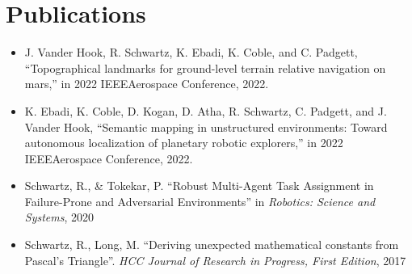 \documentclass[letterpaper,11pt]{article}
\makeatletter
\newcommand{\resumeItem}[1]{
  \item\small{
    {#1 \vspace{-2pt}}
  }
}
\newcommand{\resumeProjectHeading}[2]{
    \item
    \begin{tabular*}{0.97\textwidth}{l@{\extracolsep{\fill}}r}
      \small#1 & #2 \\
    \end{tabular*}\vspace{-7pt}
}
\newcommand{\resumeSubHeadingListStart}{\begin{itemize}[leftmargin=0.15in, label={}]}
\newcommand{\resumeSubHeadingListEnd}{\end{itemize}}
\newcommand{\resumeItemListStart}{\begin{itemize}}
\newcommand{\resumeItemListEnd}{\end{itemize}\vspace{-5pt}}
\makeatother
\begin{document}


\section{Publications}
\small{
    \begin{itemize}
        \item J. Vander Hook, R. Schwartz, K. Ebadi, K. Coble, and C. Padgett, “Topographical landmarks for ground-level terrain relative navigation on mars,” in 2022 IEEEAerospace Conference, 2022.

        \item K. Ebadi, K. Coble, D. Kogan, D. Atha, R. Schwartz, C. Padgett, and J. Vander Hook, “Semantic  mapping in unstructured environments:  Toward autonomous localization of planetary robotic explorers,” in 2022 IEEEAerospace Conference, 2022.

        \item Schwartz, R., \& Tokekar, P. “Robust Multi-Agent Task Assignment in Failure-Prone and Adversarial Environments” in \textit{Robotics: Science and Systems}, 2020

        \item Schwartz, R., Long, M. “Deriving unexpected mathematical constants from Pascal’s Triangle”. \textit{HCC Journal of Research in Progress, First Edition}, 2017
    \end{itemize}
    
}
\end{document}
